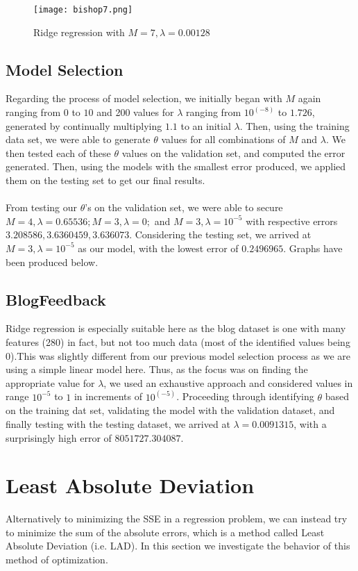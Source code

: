\documentclass{article}
\begin{document}
\begin{figure}
\label{p3figure1}
\texttt{[image: bishop7.png]}
\caption{Ridge regression with $M = 7, \lambda = 0.00128$}
\end{figure}

\subsection{Model Selection}
Regarding the process of model selection, we initially began with $M$ again ranging from $0$ to $10$ and 200 values for $\lambda$ ranging from $10 ^ (-8)$ to $1.726$, generated by continually multiplying $1.1$ to an initial $\lambda$. Then, using the training data set, we were able to generate $\theta$ values for all combinations of $M$ and $\lambda$. We then tested each of these $\theta$ values on the validation set, and computed the error generated. Then, using the models with the smallest error produced, we applied them on the testing set to get our final results. \\ \\ 
From testing our $\theta$'s on the validation set, we were able to secure $M = 4, \lambda = 0.65536; M = 3, \lambda = 0;$ and $M = 3, \lambda = 10 ^ {-5}$ with respective errors $3.208586, 3.6360459, 3.636073$. Considering the testing set, we arrived at $M = 3, \lambda = 10 ^ {-5}$ as our model, with the lowest error of $0.2496965$. Graphs have been produced below.

\subsection{BlogFeedback}
Ridge regression is especially suitable here as the blog dataset is one with many features (280) in fact, but not too much data (most of the identified values being $0$).This was slightly different from our previous model selection process as we are using a simple linear model here. Thus, as the focus was on finding the appropriate value for $\lambda$, we used an exhaustive approach and considered values in range $10 ^ {-5}$ to $1$ in increments of $10 ^ (-5)$. Proceeding through identifying $\theta$ based on the training dat set, validating the model with the validation dataset, and finally testing with the testing dataset, we arrived at $\lambda = 0.0091315$, with a surprisingly high error of $8051727.304087$.

\section{Least Absolute Deviation}
Alternatively to minimizing the SSE in a regression problem, we can instead try to minimize the sum of the absolute errors, which is a method called Least Absolute Deviation (i.e. LAD). In this section we investigate the behavior of this method of optimization.
\end{document}
